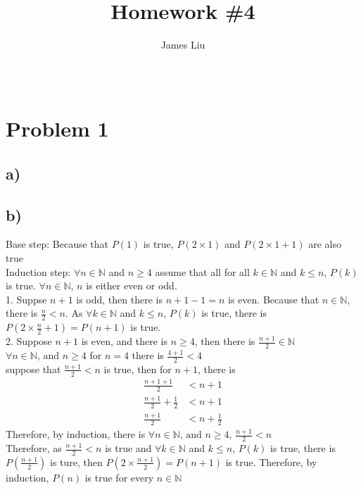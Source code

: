 \documentclass{article}
\title{\textbf{Homework \#4 }}
\author{James Liu}
\date{\ }
\begin{document}
\maketitle

\section*{Problem 1}
    \subsection*{a)}

    \subsection*{b)}
        Base step:\newline 
        Because that $P(1)$ is true, $P(2\times 1)$ and $P(2\times 1+1)$ are also true\\
        Induction step:\newline
        $\forall n\in \mathbb{N}$ and $n\geqslant 4$ assume that all 
        for all $k\in \mathbb{N}$ and $ k \leqslant n$, $P(k)$ is true. \(\forall n\in \mathbb{N}\), \(n\) is either even or odd.
        \\
        1. Suppse $n+1$ is odd, then there is $n+1-1=n$ is even. Because that \(n\in \mathbb{N}\), 
        there is \(\frac{n}{2} < n\). As $\forall k\in \mathbb{N}$ and $ k \leqslant n$, $P(k)$ is true, there is $P(2\times \frac{n}{2}+1) = P(n+1)$ is true.\\
        2. Suppose $n+1$ is even, and there is $n\geqslant 4$, then there is $\displaystyle{\frac {n+1}{2}\in \mathbb{N}}$
        \\
        $\forall n\in \mathbb{N}\text{, and } n\geqslant4$ for $n=4$ there is $\displaystyle{\frac{4+1}{2}<4}$\\
        suppose that $\displaystyle{\frac{n+1}{2}<n}$ is true, then for $n+1$, there is 
        \begin{align*}
            \frac{n+1+1}{2}&<n+1\\
            \frac{n+1}{2}+\frac{1}{2}&<n+1\\
            \frac{n+1}{2}&<n+\frac{1}{2}
        \end{align*}
        Therefore, by induction, there is $\forall n\in \mathbb{N}\text{, and } n\geqslant4$,  $\displaystyle{\frac{n+1}{2}<n}$\\
        Therefore, as $\displaystyle{\frac{n+1}{2}<n}$ is true and $\forall k\in \mathbb{N}$ and $ k \leqslant n$, $P(k)$ is true,
        there is $P(\frac{n+1}{2})$ is ture, then $P(2\times\frac{n+1}{2})=P(n+1)$ is true.
        Therefore, by induction, \(P(n)\) is true for every $n\in \mathbb{N}$
\end{document}
